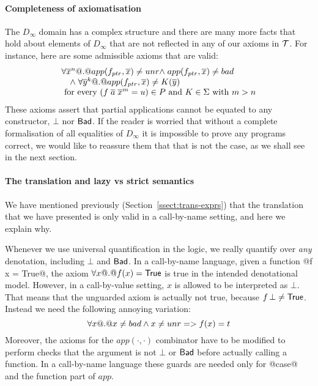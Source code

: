 \paragraph{Completeness of axiomatisation}

The $D_\infty$ domain has a complex structure and there are many more facts that
hold about elements of $D_\infty$ that are not reflected in any of our axioms in ${\cal T}$.
For instance, here are some admissible axioms that are valid:
\[\begin{array}{l}
    {\ensuremath{\forall \overline{x}^{n} @.@ app(f_{ptr},\overline{x}) \neq \mathop{unr}}}
    {\ensuremath{\land\; app(f_{ptr},\overline{x}) \neq \mathop{bad}}} \\
    {\quad\land\; \forall \overline{y}^{k} @.@ app(f_{ptr},\overline{x}) \neq K(\overline{y})} \\
    \mbox{ for every } (f\;\overline{a}\;\overline{x}^{m} = u) \in P
    \mbox{ and } K \in \Sigma \mbox{ with } m > n
\end{array}\]
These axioms assert that partial applications cannot be equated to
any constructor, $\bot$ nor $\mathsf{Bad}$. If the reader is worried that without a
complete formalisation of all equalities of $D_\infty$ it is impossible to prove any
programs correct, we would like to reassure them that that is not the case, as we
shall see in the next section.

\paragraph{The translation and lazy vs strict semantics}

We have mentioned previously (Section~\ref{ssect:trans-exprs}) that the 
translation that we have presented is only valid in a call-by-name setting, 
and here we explain why. 

Whenever we use universal quantification in the logic, we really quantify over
{\em any} denotation, including $\bot$ and $\mathsf{Bad}$. In a call-by-name language, 
given a function @f x = True@, the axiom $\forall x @.@ f(x) = \mathsf{True}$ 
is true in the intended denotational model. However, in a call-by-value setting, $x$ 
is allowed to be interpreted as $\bot$. That means that the unguarded axiom is 
actually not true, because $f\,\bot \not= \mathsf{True}$.
Instead we need the following annoying variation:
\[  \forall x @.@ x \neq bad \land x \neq \mathop{unr} => f(x) = t \]
Moreover, the axioms for the $app(\cdot,\cdot)$ combinator have to be modified
to perform checks that the argument is not $\bot$ or $\mathsf{Bad}$ before actually 
calling a function.   In a call-by-name language these guards are needed 
only for @case@ and the function part of $app$.

